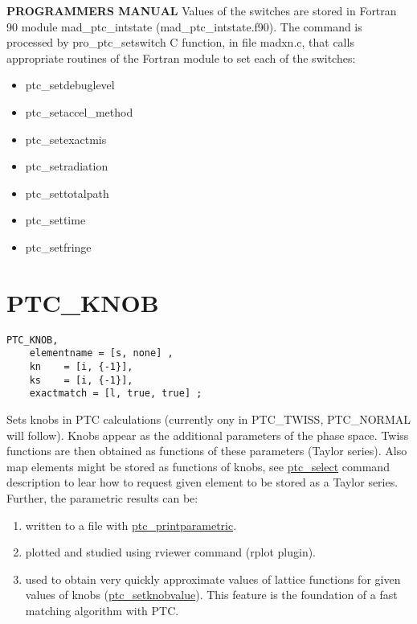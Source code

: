 {\bf PROGRAMMERS MANUAL}   
Values of the switches are stored in Fortran 90 module
mad\_ptc\_intstate (mad\_ptc\_intstate.f90). The command is processed by
pro\_ptc\_setswitch C function, in file madxn.c, that calls appropriate
routines of the Fortran module to set each of the switches:   
\begin{itemize}
   \item  ptc\_setdebuglevel 
   \item  ptc\_setaccel\_method 
   \item  ptc\_setexactmis 
   \item  ptc\_setradiation 
   \item  ptc\_settotalpath 
   \item  ptc\_settime 
   \item  ptc\_setfringe  
\end{itemize}



%

\section{PTC\_KNOB}

\begin{verbatim}
PTC_KNOB, 
    elementname = [s, none] , 
    kn    = [i, {-1}], 
    ks    = [i, {-1}], 
    exactmatch = [l, true, true] ; 
\end{verbatim}

 Sets knobs in PTC calculations (currently ony in PTC\_TWISS,
 PTC\_NORMAL will follow). Knobs appear as the additional parameters of
 the phase space. Twiss functions are then obtained  as functions of
 these parameters (Taylor series).  Also map elements might be stored as
 functions of knobs, see  \href{PTC_Select.html}{ ptc\_select} command
 description to lear how to request given element to be stored as a
 Taylor series.  \\

Further, the parametric results can be: 
\begin{enumerate}
   \item  written to a file with
     \href{PTC_PrintParametric.html}{ptc\_printparametric}. 
   \item  plotted and studied using rviewer command (rplot plugin). 
   \item  used to obtain very quickly approximate values of lattice
     functions for given values of knobs
     (\href{PTC_SetKnobValue.html}{ptc\_setknobvalue}). This
     feature is the foundation of a fast matching algorithm with
     PTC.      
\end{enumerate}


